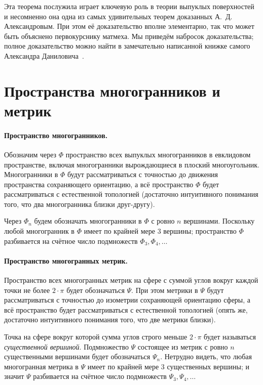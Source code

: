 \documentclass[oneside,a4paper]{article}
\begin{document}
Эта теорема 
послужила играет ключевую роль в теории выпуклых поверхностей 
и несомненно она одна из самых удивительных теорем доказанных А.~Д. Александровым.
При этом её доказательство вполне элементарно, так что может быть объяснено первокурснику матмеха.
Мы приведём набросок доказательства; полное доказательство можно найти в замечательно написанной книжке самого Александра Даниловича~\cite{alexandrov}.


\section{Пространства многогранников и метрик}

\paragraph{Пространство многогранников.}
Обозначим через $\Phi$ пространство всех выпуклых многогранников в евклидовом пространстве, включая многогранники вырождающиеся в плоский многоугольник.
Многогранники в $\Phi$ будут рассматриваться с точностью до движения пространства сохраняющего ориентацию, а всё пространство $\Phi$ будет рассматриваться с естественной топологией (достаточно интуитивного понимания того, что два многогранника близки друг-другу).

Через $\Phi_n$ будем обозначать многогранники в $\Phi$ с ровно $n$ вершинами.
Поскольку любой многогранник в $\Phi$ имеет по крайней мере 3 вершины;
пространство $\Phi$ разбивается на счётное число подмножеств $\Phi_3,\Phi_4,\dots$

\paragraph{Пространство многогранных метрик.}
Пространство всех многогранных метрик на сфере с суммой углов вокруг каждой точки не более $2\cdot\pi$ будет обозначаться $\Psi$.
При этом метрики в $\Psi$ будут рассматриваться с точностью до изометрии сохраняющей ориентацию сферы, а всё пространство будет рассматриваться с естественной топологией (опять же, достаточно интуитивного понимания того, что две метрики близки).

Точка на сфере вокруг которой сумма углов строго меньше $2\cdot\pi$ будет называться \emph{существенной вершиной}.
Подмножество $\Psi$ состоящее из метрик с ровно $n$ существенными вершинами будет обозначаться $\Psi_n$.
Нетрудно видеть, что любая многогранная метрика в $\Psi$ имеет по крайней мере 3 существенных вершины;
и значит $\Psi$ разбивается на счётное число подмножеств $\Psi_3,\Psi_4,\dots$
\end{document}
